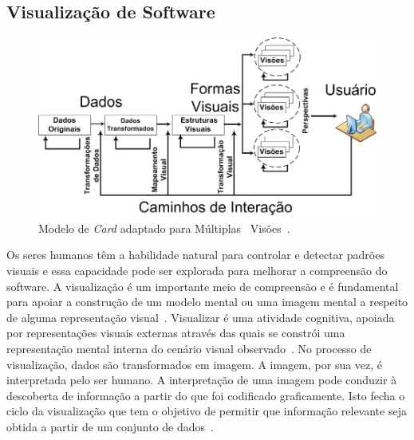 \documentclass[12pt]{article}
\begin{document}
\subsection{Visualização de Software}



\begin{figure}[h]
 \centering
 \includegraphics[scale=0.39]{image.png}
 \caption{Modelo de \textit{Card} adaptado para Múltiplas~ Visões~\cite{source_miner_glauco}.}
 \label{fig:modelo_card}
\end{figure}
Os seres humanos têm a habilidade natural para controlar e detectar padrões visuais e essa capacidade pode ser explorada para melhorar a compreensão do software. A visualização é um importante meio de compreensão e é fundamental para apoiar a construção de um modelo mental ou uma imagem mental a respeito de alguma representação visual~\cite{spence2014information}. Visualizar é uma atividade cognitiva, apoiada por representações visuais externas através das quais se constrói uma representação mental interna do cenário visual observado~\cite{spence2014information, ware2012information}. No processo de visualização, dados são transformados em imagem. A imagem, por sua vez, é interpretada pelo ser humano. A interpretação de uma imagem pode conduzir à descoberta de informação a partir do que foi codificado graficamente. Isto fecha o ciclo da visualização que tem o objetivo de permitir que informação relevante seja obtida a partir de um conjunto de dados~\cite{source_miner_glauco}. 
\end{document}
